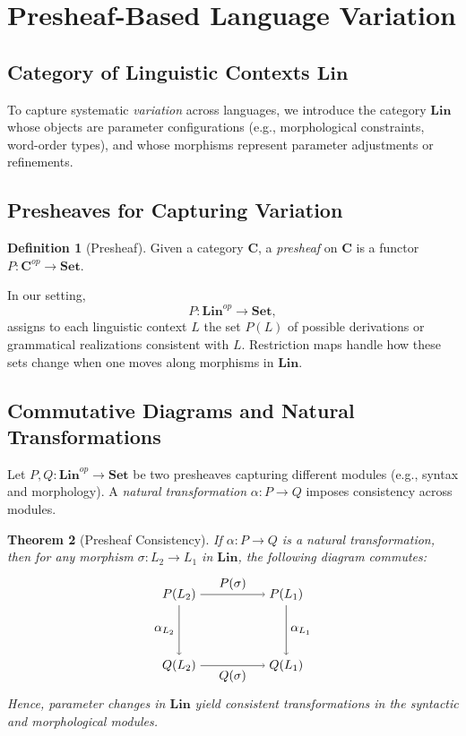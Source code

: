 \documentclass[12pt]{article}
\theoremstyle{plain}
\newtheorem{theorem}{Theorem}[section]
\theoremstyle{definition}
\newtheorem{definition}[theorem]{Definition}
\begin{document}
\section{Presheaf-Based Language Variation}

\subsection{Category of Linguistic Contexts \(\mathbf{Lin}\)}
To capture systematic \emph{variation} across languages, we introduce the category \(\mathbf{Lin}\) whose objects are parameter configurations (e.g., morphological constraints, word-order types), and whose morphisms represent parameter adjustments or refinements.

\subsection{Presheaves for Capturing Variation}
\begin{definition}[Presheaf]
Given a category \(\mathbf{C}\), a \emph{presheaf} on \(\mathbf{C}\) is a functor \(P: \mathbf{C}^{op} \to \mathbf{Set}\).
\end{definition}

In our setting,
\[
P: \mathbf{Lin}^{op} \to \mathbf{Set},
\]
assigns to each linguistic context \(L\) the set \(P(L)\) of possible derivations or grammatical realizations consistent with \(L\). Restriction maps handle how these sets change when one moves along morphisms in \(\mathbf{Lin}\).

\subsection{Commutative Diagrams and Natural Transformations}
Let \(P, Q: \mathbf{Lin}^{op} \to \mathbf{Set}\) be two presheaves capturing different modules (e.g., syntax and morphology). A \emph{natural transformation} \(\alpha: P \to Q\) imposes consistency across modules.

\begin{theorem}[Presheaf Consistency]\label{thm:PresheafConsistency}
If \(\alpha: P \to Q\) is a natural transformation, then for any morphism \(\sigma: L_2 \to L_1\) in \(\mathbf{Lin}\), the following diagram commutes:
\[
\begin{tikzpicture}[node distance=4em, auto]
  \node (P2) at (0,0) {$P(L_2)$};
  \node (P1) at (3,0) {$P(L_1)$};
  \node (Q2) at (0,-2) {$Q(L_2)$};
  \node (Q1) at (3,-2) {$Q(L_1)$};

  \draw[->] (P2) to node {$P(\sigma)$} (P1);
  \draw[->] (Q2) to node [below] {$Q(\sigma)$} (Q1);
  \draw[->] (P2) to node [left] {$\alpha_{L_2}$} (Q2);
  \draw[->] (P1) to node [right] {$\alpha_{L_1}$} (Q1);
\end{tikzpicture}
\]
Hence, parameter changes in \(\mathbf{Lin}\) yield consistent transformations in the syntactic and morphological modules.
\end{theorem}
\end{document}
